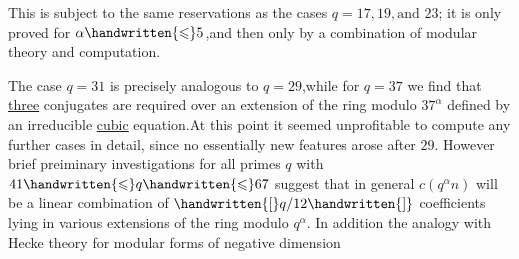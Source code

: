 This is subject to the same reservations as the cases $q=17,19,\text{and }23$; it is only proved for $\alpha\handwritten{\leqslant}5$,and then only by a combination of modular theory and computation.

The case $q=31$ is precisely analogous to $q=29$,while for $q=37$ we find that \uline{three} conjugates are required over an extension of the ring modulo $37^{\alpha}$ defined by an irreducible \uline{cubic} equation.At this point it seemed unprofitable to compute any further cases in detail, since no essentially new features arose after $29$. However brief preiminary investigations for all primes \uline{$q$} with $41\handwritten{\leqslant}q\handwritten{\leqslant}67$ suggest that in general $c(q^{\alpha}n)$ will be a linear combination of $\handwritten{[}q/12\handwritten{]}$  coefficients lying in various extensions of the ring modulo $q^{\alpha}$. In addition the analogy with Hecke theory for modular forms of negative dimension
